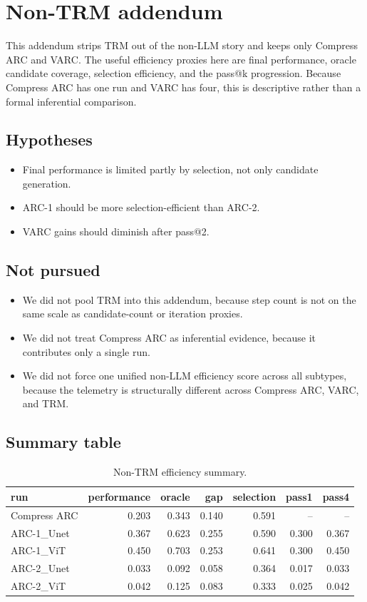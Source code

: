 \section{Non-TRM addendum}
This addendum strips TRM out of the non-LLM story and keeps only Compress ARC and VARC. The useful efficiency proxies here are final performance, oracle candidate coverage, selection efficiency, and the pass@k progression. Because Compress ARC has one run and VARC has four, this is descriptive rather than a formal inferential comparison.

\subsection{Hypotheses}
\begin{itemize}
\item Final performance is limited partly by selection, not only candidate generation.
\item ARC-1 should be more selection-efficient than ARC-2.
\item VARC gains should diminish after pass@2.
\end{itemize}

\subsection{Not pursued}
\begin{itemize}
\item We did not pool TRM into this addendum, because step count is not on the same scale as candidate-count or iteration proxies.
\item We did not treat Compress ARC as inferential evidence, because it contributes only a single run.
\item We did not force one unified non-LLM efficiency score across all subtypes, because the telemetry is structurally different across Compress ARC, VARC, and TRM.
\end{itemize}

\subsection{Summary table}
\begin{table}[htbp]
\centering
\caption{Non-TRM efficiency summary.}
\label{tab:nontrm_summary}
\begin{tabular}{lrrrrrr}
\toprule
run & performance & oracle & gap & selection & pass1 & pass4 \\
\midrule
Compress ARC & 0.203 & 0.343 & 0.140 & 0.591 & -- & -- \\
ARC-1\_Unet & 0.367 & 0.623 & 0.255 & 0.590 & 0.300 & 0.367 \\
ARC-1\_ViT & 0.450 & 0.703 & 0.253 & 0.641 & 0.300 & 0.450 \\
ARC-2\_Unet & 0.033 & 0.092 & 0.058 & 0.364 & 0.017 & 0.033 \\
ARC-2\_ViT & 0.042 & 0.125 & 0.083 & 0.333 & 0.025 & 0.042 \\
\bottomrule
\end{tabular}
\end{table}

